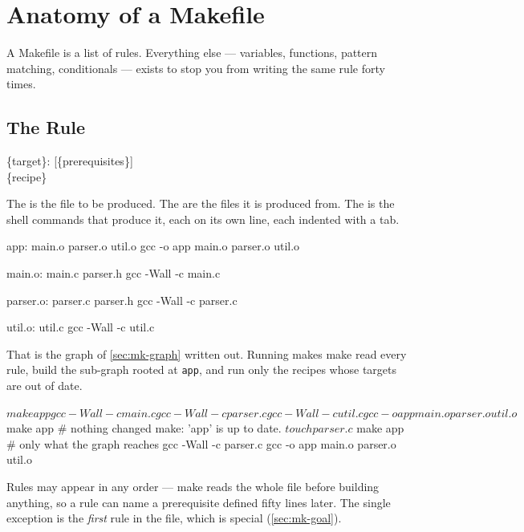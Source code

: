 \chapter{Anatomy of a Makefile}\label{ch:mk-anatomy}

A Makefile is a list of rules. Everything else --- variables, functions,
pattern matching, conditionals --- exists to stop you from writing the same rule
forty times.

\section{The Rule}\label{sec:mk-rule}

\begin{center}
	\ttfamily\large
	\{target\}: [\{prerequisites\}]\\[2pt]
	\textrightarrow\{recipe\}
\end{center}

\begin{definition}
	The  is the file to be produced. The  are
	the files it is produced from. The  is the shell commands that
	produce it, each on its own line, each indented with a tab.
\end{definition}

\begin{makecode}
app: main.o parser.o util.o
    gcc -o app main.o parser.o util.o

main.o: main.c parser.h
    gcc -Wall -c main.c

parser.o: parser.c parser.h
    gcc -Wall -c parser.c

util.o: util.c
    gcc -Wall -c util.c
\end{makecode}

That is the graph of \autoref{sec:mk-graph} written out. Running 
makes make read every rule, build the sub-graph rooted at \texttt{app}, and run
only the recipes whose targets are out of date.

\begin{shell}
$ make app
gcc -Wall -c main.c
gcc -Wall -c parser.c
gcc -Wall -c util.c
gcc -o app main.o parser.o util.o
$ make app                      # nothing changed
make: 'app' is up to date.
$ touch parser.c
$ make app                      # only what the graph reaches
gcc -Wall -c parser.c
gcc -o app main.o parser.o util.o
\end{shell}

\begin{note}
	Rules may appear in any order --- make reads the whole file before building
	anything, so a rule can name a prerequisite defined fifty lines later. The
	single exception is the \emph{first} rule in the file, which is special
	(\autoref{sec:mk-goal}).
\end{note}

